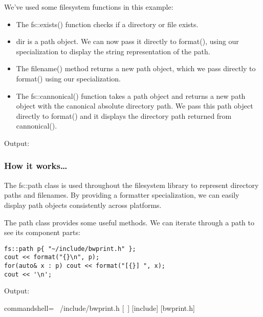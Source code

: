 \begin{itemize}
We've used some filesystem functions in this example:

\begin{itemize}
\item 
The fs::exists() function checks if a directory or file exists.

\item 
dir is a path object. We can now pass it directly to format(), using our specialization to display the string representation of the path.

\item 
The filename() method returns a new path object, which we pass directly to format() using our specialization.

\item 
The fs::cannonical() function takes a path object and returns a new path object with the canonical absolute directory path. We pass this path object directly to format() and it displays the directory path returned from cannonical().
\end{itemize}

Output:


\end{itemize}

\subsubsection{How it works…}

The fs::path class is used throughout the filesystem library to represent directory paths and filenames. By providing a formatter specialization, we can easily display path objects consistently across platforms.

The path class provides some useful methods. We can iterate through a path to see its component parts:

\begin{lstlisting}[style=styleCXX]
fs::path p{ "~/include/bwprint.h" };
cout << format("{}\n", p);
for(auto& x : p) cout << format("[{}] ", x);
cout << '\n';
\end{lstlisting}

Output:

\begin{tcblisting}{commandshell={}}
~/include/bwprint.h
[~] [include] [bwprint.h]
\end{tcblisting}

